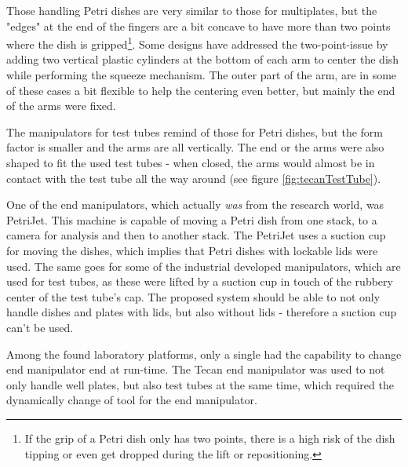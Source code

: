 \documentclass[10pt,a4paper]{article}
\begin{document}
	Those\cite{jelCorporation_webpage}\cite{scirobotics_webpage}\cite{tecan_webpage} handling Petri dishes are very similar to those for multiplates, but the "edges" at the end of the fingers are a bit concave to have more than two points where the dish is gripped\footnote{If the grip of a Petri dish only has two points, there is a high risk of the dish tipping or even get dropped during the lift or repositioning.}. Some designs have addressed the two-point-issue by adding two vertical plastic cylinders at the bottom of each arm to center the dish while performing the squeeze mechanism. The outer part of the arm, are in some of these cases a bit flexible to help the centering even better, but mainly the end of the arms were fixed.
	
	The manipulators for test tubes remind of those for Petri dishes, but the form factor is smaller and the arms are all vertically. The end or the arms were also shaped to fit the used test tubes - when closed, the arms would almost be in contact with the test tube all the way around (see figure \ref{fig:tecanTestTube}).
	

	
	One of the end manipulators, which actually \textit{was} from the research world, was PetriJet\cite{petrijet_ding2015jala}. This machine is capable of moving a Petri dish from one stack, to a camera for analysis and then to another stack. The PetriJet uses a suction cup for moving the dishes, which implies that Petri dishes with lockable lids were used. The same goes for some of the industrial developed manipulators, which are used for test tubes, as these were lifted by a suction cup in touch of the rubbery center of the test tube's cap. The proposed system should be able to not only handle dishes and plates with lids, but also without lids - therefore a suction cup can't be used.
	
	Among the found laboratory platforms, only a single had the capability to change end manipulator end at run-time\cite{tecan_webpage}. The Tecan end manipulator was used to not only handle well plates, but also test tubes at the same time, which required the dynamically change of tool for the end manipulator.\\
	
		
	
	
\end{document}
